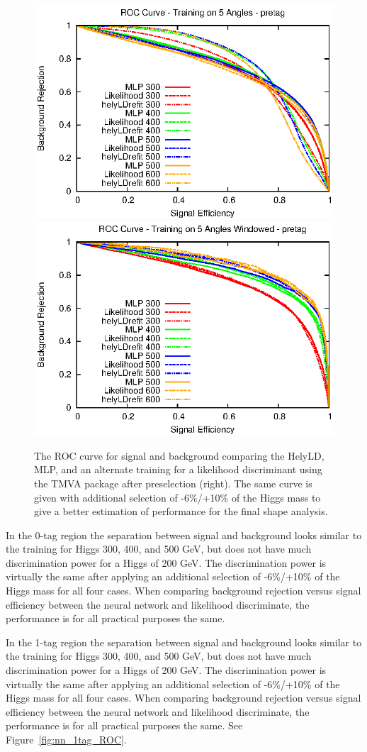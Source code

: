 \begin{figure}[htb!]
\begin{center}
\centerline{
\includegraphics[width=0.49\linewidth]{Optimization/pretag_ROC_full_5.eps}
\includegraphics[width=0.49\linewidth]{Optimization/pretag_ROC_win_5.eps}
}
\caption{The ROC curve for signal and background comparing the HelyLD, MLP, and an alternate training for a likelihood discriminant using the TMVA package after preselection (right).  The same curve is given with additional selection of -6\%/+10\% of the Higgs mass to give a better estimation of performance for the final shape analysis.
}
\label{fig:windowcuts}
\end{center}
\end{figure}

In the 0-tag region the separation between signal and background looks similar to the training for Higgs 300, 400, and 500 GeV, but does not have much discrimination power for a Higgs of 200 GeV.  The discrimination power is virtually the same after applying an additional selection of -6\%/+10\% of the Higgs mass for all four cases. When comparing background rejection versus signal efficiency between the neural network and likelihood discriminate, the performance is for all practical purposes the same.

In the 1-tag region the separation between signal and background looks similar to the training for Higgs 300, 400, and 500 GeV, but does not have much discrimination power for a Higgs of 200 GeV.  The discrimination power is virtually the same after applying an additional selection of -6\%/+10\% of the Higgs mass for all four cases. When comparing background rejection versus signal efficiency between the neural network and likelihood discriminate, the performance is for all practical purposes the same. See Figure~\ref{fig:nn_1tag_ROC}.

